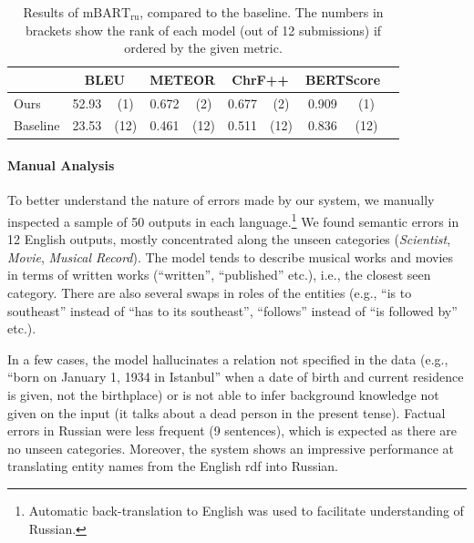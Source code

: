 \begin{table}[t]
    \footnotesize\centering
    \begin{tabular}{llcccccccc}\toprule
                 & \multicolumn{2}{c}{\bf BLEU} & \multicolumn{2}{c}{\bf METEOR} & \multicolumn{2}{c}{\bf ChrF++} & \multicolumn{2}{c}{\bf BERTScore}                               \\\midrule
        Ours     & 52.93                        & (1)                            & 0.672                          & (2)                               & 0.677 & (2)  & 0.909 & (1)  \\
        Baseline & 23.53                        & (12)                           & 0.461                          & (12)                              & 0.511 & (12) & 0.836 & (12) \\\bottomrule
    \end{tabular}
    \caption[Results of our Russian model compared to the baseline.]{Results of $\text{mBART}_{\text{ru}}$, compared to the baseline. The numbers in brackets show the rank of each model (out of 12 submissions) if ordered by the given metric.}
    \label{tab:mbart:results-ru}
\end{table}

\paragraph{Manual Analysis}
To better understand the nature of errors made by our system, we manually inspected a sample of 50 outputs in each language.\footnote{Automatic back-translation to English was used to facilitate understanding of Russian.} We found semantic errors in 12 English outputs, mostly concentrated along the unseen categories (\emph{Scientist}, \emph{Movie}, \emph{Musical Record}). The model tends to describe musical works and movies in terms of written works (``written'', ``published'' etc.), i.e., the closest seen category. There are also several swaps in roles of the entities (e.g., ``is to southeast'' instead of ``has to its southeast'', ``follows'' instead of ``is followed by'' etc.).

In a few cases, the model hallucinates a relation not specified in the data (e.g., ``born on January 1, 1934 in Istanbul'' when a date of birth and current residence is given, not the birthplace) or is not able to infer background knowledge not given on the input (it talks about a dead person in the present tense).
Factual errors in Russian were less frequent (9 sentences), which is expected as there are no unseen categories. Moreover, the system shows an impressive performance at translating entity names from the English \ac{rdf} into Russian.


